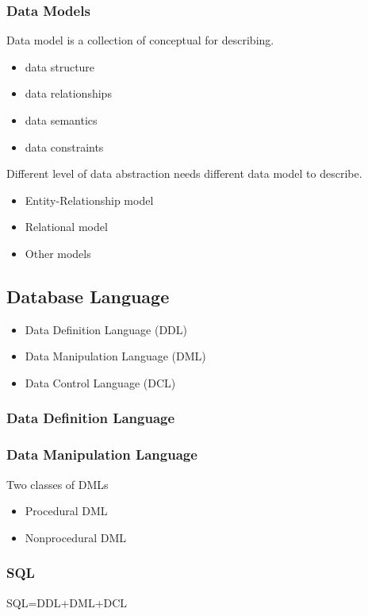 \subsubsection{Data Models}
Data model is a collection of conceptual for describing. 
\begin{itemize}
    \item data structure
    \item data relationships
    \item data semantics
    \item data constraints
\end{itemize}
Different level of data abstraction needs different data model to describe. 
\begin{itemize}
    \item Entity-Relationship model
    \item Relational model
    \item Other models 
\end{itemize}

\subsection{Database Language}
\begin{itemize}
    \item Data Definition Language (DDL)
    \item Data Manipulation Language (DML)
    \item Data Control Language (DCL)
\end{itemize}

\subsubsection{Data Definition Language}

\subsubsection{Data Manipulation Language}

Two classes of DMLs
\begin{itemize}
    \item Procedural DML
    \item Nonprocedural DML
\end{itemize}

\subsubsection{SQL}
SQL=DDL+DML+DCL

